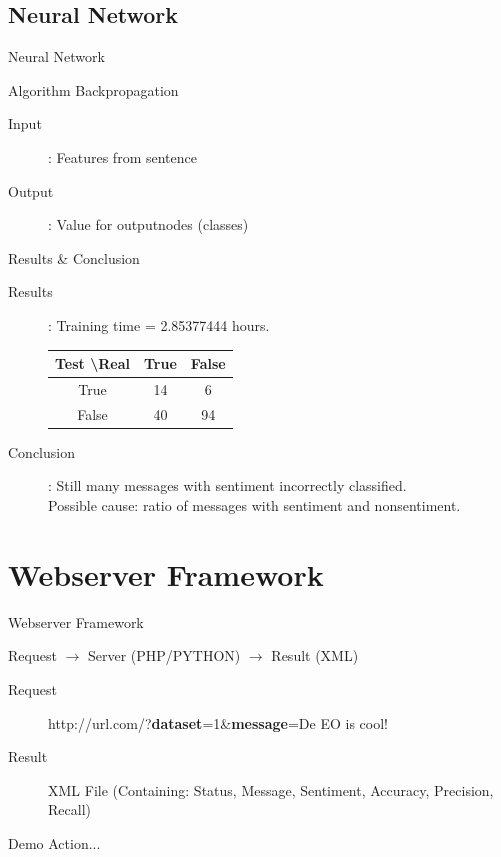 \documentclass{beamer}
\begin{document}
\subsection{Neural Network}
\begin{frame}{Neural Network}
\begin{block}{Algorithm}
Backpropagation
\end{block}
\begin{description}
\item[Input]: Features from sentence
\item[Output]: Value for outputnodes (classes)
\end{description}
\end{frame}
\begin{frame}{Results \& Conclusion}
\begin{description}
\item[Results]: Training time = 2.85377444 hours.\\
\begin{tabular}{c || c | c}\\
Test \textbackslash Real & True & False \\
\hline
True & 14 & 6 \\
False & 40 & 94 \\
\end{tabular}

\item[Conclusion]: Still many messages with sentiment incorrectly classified. \\Possible cause: ratio of messages with sentiment and nonsentiment.
\end{description}
\end{frame}

\section{Webserver Framework}
\begin{frame}{Webserver Framework}
\begin{center}
Request $\rightarrow$ Server (PHP/PYTHON) $\rightarrow$ Result (XML)
\end{center}

\begin{description}
\item[Request] http://url.com/?\textbf{dataset}=1\&\textbf{message}=De EO is cool!\\
\item[Result] XML File (Containing: Status, Message, Sentiment, Accuracy, Precision, Recall)
\end{description}
\end{frame}
\begin{frame}{Demo}
Action...
\end{frame}
\end{document}
